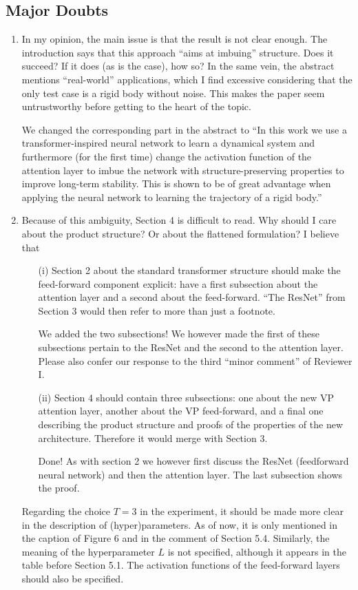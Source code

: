 \documentclass{article}
\begin{document}
\subsection*{Major Doubts}
\begin{enumerate}
    \item In my opinion, the main issue is that the result is not clear enough. The introduction says that this approach ``aims at imbuing'' structure. Does it succeed? If it does (as is the case), how so? In the same vein, the abstract mentions ``real-world'' applications, which I find excessive considering that the only test case is a rigid body without noise. This makes the paper seem untrustworthy before getting to the heart of the topic.
    
    {\color{mred} We changed the corresponding part in the abstract to ``In this work we use a transformer-inspired neural network to learn a dynamical system and furthermore (for the first time) change the activation function of the attention layer to imbue the network with structure-preserving properties to improve long-term stability. This is shown to be of great advantage when applying the neural network to learning the trajectory of a rigid body.''}

    \item Because of this ambiguity, Section 4 is difficult to read. Why should I care about the product structure? Or about the flattened formulation? I believe that 
    \begin{enumerate} 
    \item[(i)] Section 2 about the standard transformer structure should make the feed-forward component explicit: have a first subsection about the attention layer and a second about the feed-forward. ``The ResNet'' from Section 3 would then refer to more than just a footnote.
    
    {\color{mred} We added the two subsections! We however made the first of these subsections pertain to the ResNet and the second to the attention layer. Please also confer our response to the third ``minor comment'' of Reviewer I.}
    \item[(ii)] Section 4 should contain three subsections: one about the new VP attention layer, another about the VP feed-forward, and a final one describing the product structure and proofs of the properties of the new architecture. Therefore it would merge with Section 3.
    
    {\color{mred} Done! As with section 2 we however first discuss the ResNet (feedforward neural network) and then the attention layer. The last subsection shows the proof.}
    \end{enumerate}
    Regarding the choice $T = 3$ in the experiment, it should be made more clear in the description of (hyper)parameters. As of now, it is only mentioned in the caption of Figure 6 and in the comment of Section 5.4. Similarly, the meaning of the hyperparameter $L$ is not specified, although it appears in the table before Section 5.1. The activation functions of the feed-forward layers should also be specified.


\end{enumerate}
\end{document}
